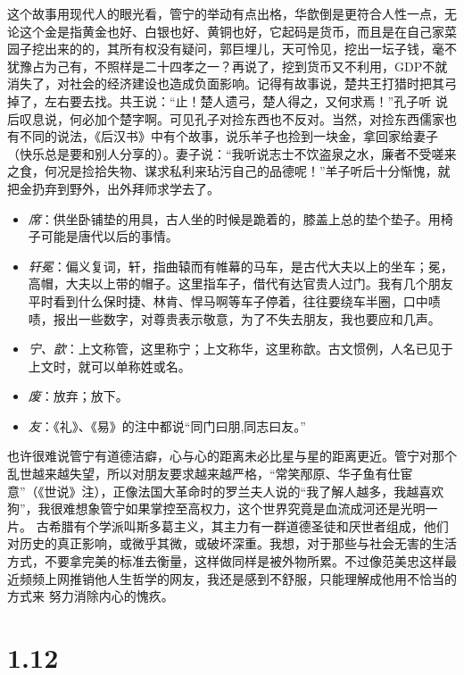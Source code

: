 \documentclass[]{book}
\providecommand{\tightlist}{%
  \setlength{\itemsep}{0pt}\setlength{\parskip}{0pt}}
\begin{document}
这个故事用现代人的眼光看，管宁的举动有点出格，华歆倒是更符合人性一点，无论这个金是指黄金也好、白银也好、黄铜也好，它起码是货币，而且是在自己家菜园子挖出来的的，其所有权没有疑问，郭巨埋儿，天可怜见，挖出一坛子钱，毫不犹豫占为己有，不照样是二十四孝之一？再说了，挖到货币又不利用，GDP不就消失了，对社会的经济建设也造成负面影响。记得有故事说，楚共王打猎时把其弓掉了，左右要去找。共王说：``止！楚人遗弓，楚人得之，又何求焉！''孔子听
说后叹息说，何必加个楚字啊。可见孔子对捡东西也不反对。当然，对捡东西儒家也有不同的说法，《后汉书》中有个故事，说乐羊子也捡到一块金，拿回家给妻子（快乐总是要和别人分享的）。妻子说：``我听说志士不饮盗泉之水，廉者不受嗟来之食，何况是捡拾失物、谋求私利来玷污自己的品德呢！''羊子听后十分惭愧，就把金扔弃到野外，出外拜师求学去了。

\begin{itemize}
\tightlist
\item
  \emph{席}：供坐卧铺垫的用具，古人坐的时候是跪着的，膝盖上总的垫个垫子。用椅子可能是唐代以后的事情。
\item
  \emph{轩冕}：偏义复词，轩，指曲辕而有帷幕的马车，是古代大夫以上的坐车；冕，高帽，大夫以上带的帽子。这里指车子，借代有达官贵人过门。我有几个朋友平时看到什么保时捷、林肯、悍马啊等车子停着，往往要绕车半圈，口中啧啧，报出一些数字，对尊贵表示敬意，为了不失去朋友，我也要应和几声。
\item
  \emph{宁、歆}：上文称管，这里称宁；上文称华，这里称歆。古文惯例，人名已见于上文时，就可以单称姓或名。
\item
  \emph{废}：放弃；放下。
\item
  \emph{友}：《礼》、《易》的注中都说``同门曰朋,同志曰友。''
\end{itemize}

也许很难说管宁有道德洁癖，心与心的距离未必比星与星的距离更近。管宁对那个乱世越来越失望，所以对朋友要求越来越严格，``常笑邴原、华子鱼有仕宦意''（《世说》注），正像法国大革命时的罗兰夫人说的``我了解人越多，我越喜欢狗''，我很难想象管宁如果掌控至高权力，这个世界究竟是血流成河还是光明一片。
古希腊有个学派叫斯多葛主义，其主力有一群道德圣徒和厌世者组成，他们对历史的真正影响，或微乎其微，或破坏深重。我想，对于那些与社会无害的生活方式，不要拿完美的标准去衡量，这样做同样是被外物所累。不过像范美忠这样最近频频上网推销他人生哲学的网友，我还是感到不舒服，只能理解成他用不恰当的方式来
努力消除内心的愧疚。

\section{1.12}\label{section-11}
\end{document}

